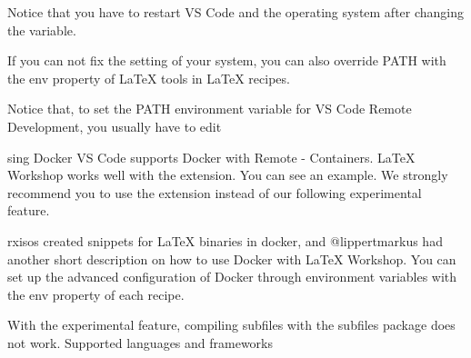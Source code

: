 \documentclass{article}
\begin{document}
Notice that you have to restart VS Code and the operating system after changing the variable.

If you can not fix the setting of your system, you can also override PATH with the env property of LaTeX tools in LaTeX recipes.

Notice that, to set the PATH environment variable for VS Code Remote Development, you usually have to edit

sing Docker
VS Code supports Docker with Remote - Containers. LaTeX Workshop works well with the extension. You can see an example. We strongly recommend you to use the extension instead of our following experimental feature.


rxisos created snippets for LaTeX binaries in docker, and @lippertmarkus had another short description on how to use Docker with LaTeX Workshop. You can set up the advanced configuration of Docker through environment variables with the env property of each recipe.

With the experimental feature, compiling subfiles with the subfiles package does not work.
Supported languages and frameworks
\end{document}
